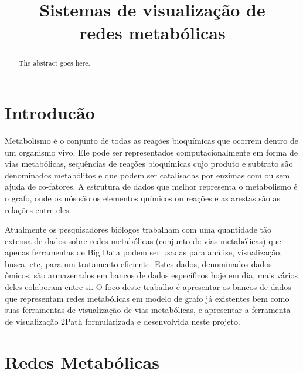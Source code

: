 \documentclass[conference]{IEEEtran}
\begin{document}
\title{Sistemas de visualização de\\redes metabólicas}

\author{
}


\maketitle

\begin{abstract}
The abstract goes here.
\end{abstract}


\section{Introducão}

\indent Metabolismo é o conjunto de todas as reações bioquímicas que ocorrem dentro de um organismo vivo. Ele pode ser representados computacionalmente em forma de vias metabólicas, sequências de reações bioquímicas cujo produto e subtrato são denominados metabólitos e que podem ser catalisadas por enzimas com ou sem ajuda de co-fatores. A estrutura de dados que melhor representa o metabolismo é o grafo, onde os nós são os elementos químicos ou reações e as arestas são as relações entre eles. 

\indent Atualmente os pesquisadores biólogos trabalham com uma quantidade tão extensa de dados sobre redes metabólicas (conjunto de vias metabólicas) que apenas ferramentas de Big Data podem ser usadas para análise, visualização, busca, etc, para um tratamento eficiente. Estes dados, denominados dados ômicos, são armazenados em bancos de dados específicos hoje em dia, mais vários deles colaboram entre si. O foco deste trabalho é apresentar os bancos de dados que representam redes metabólicas em modelo de grafo já existentes bem como suas ferramentas de visualização de vias metabólicas, e apresentar a ferramenta de visualização 2Path formularizada e desenvolvida neste projeto.

\section{Redes Metabólicas}
\end{document}
